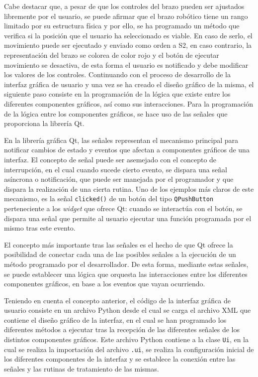 Cabe destacar que, a pesar de que los controles del brazo pueden ser ajustados libremente por el usuario, se puede afirmar que el brazo robótico tiene un rango limitado por su estructura física y por ello, se ha programado un método que verifica si la posición que el usuario ha seleccionado es viable. En caso de serlo, el movimiento puede ser ejecutado y enviado como orden a \ac{S2}, en caso contrario, la representación del brazo se colorea de color rojo y el botón de ejecutar movimiento se desactiva, de esta forma el usuario es notificado y debe modificar los valores de los controles.    
Continuando con el proceso de desarrollo de la interfaz gráfica de usuario y una vez se ha creado el diseño gráfico de la misma, el siguiente paso consiste en la programación de la lógica que existe entre los diferentes componentes gráficos, así como sus interacciones. Para la programación de la lógica entre los componentes gráficos, se hace uso de las señales que proporciona la librería Qt.

En la librería gráfica Qt, las señales representan el mecanismo principal para notificar cambios de estado y eventos que afectan a componentes gráficos de una interfaz. El concepto de señal puede ser asemejado con el concepto de interrupción, en el cual cuando sucede cierto evento, se dispara una señal asíncrona o notificación, que puede ser manejada por el programador y que dispara la realización de una cierta rutina. Uno de los ejemplos más claros de este mecanismo, es la señal \texttt{clicked()} de un botón del tipo \texttt{QPushButton} perteneciente a los \textit{widget} que ofrece Qt: cuando se interactúa con el botón, se dispara una señal que permite al usuario ejecutar una función programada por el mismo tras este evento. 

El concepto más importante tras las señales es el hecho de que Qt ofrece la posibilidad de conectar cada una de las posibles señales a la ejecución de un método programado por el desarrollador. De esta forma, mediante estas señales, se puede establecer una lógica que orquesta las interacciones entre los diferentes componentes gráficos, en base a los eventos que vayan ocurriendo.

Teniendo en cuenta el concepto anterior, el código de la interfaz gráfica de usuario consiste en un archivo Python desde el cual se carga el archivo XML que contiene el diseño gráfico de la interfaz, en el cual se han programado los diferentes métodos a ejecutar tras la recepción de las diferentes señales de los distintos componentes gráficos. Este archivo Python contiene a la clase \texttt{Ui}, en la cual se realiza la importación del archivo \texttt{.ui}, se realiza la configuración inicial de los diferentes componentes de la interfaz y se establece la conexión entre las señales y las rutinas de tratamiento de las mismas.

